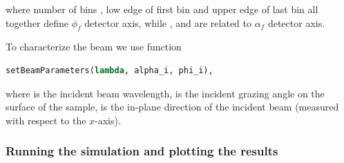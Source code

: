 \noindent where number of bins , low edge of first bin  and
upper edge of last bin  all together define $\phi_f$ detector axis,
while ,  and  are related to
$\alpha_f$ detector axis.

\vspace*{2mm}



\noindent To characterize the beam we use function
\begin{lstlisting}[language=python, style=eclipse,numbers=none]
setBeamParameters(lambda, alpha_i, phi_i),
\end{lstlisting}

\noindent where  is the incident beam wavelength,
 is the incident
grazing angle on the surface of the sample,
 is the in-plane
direction of the incident beam (measured with respect to the $x$-axis).


\subsubsection{Running the simulation and plotting the results}

